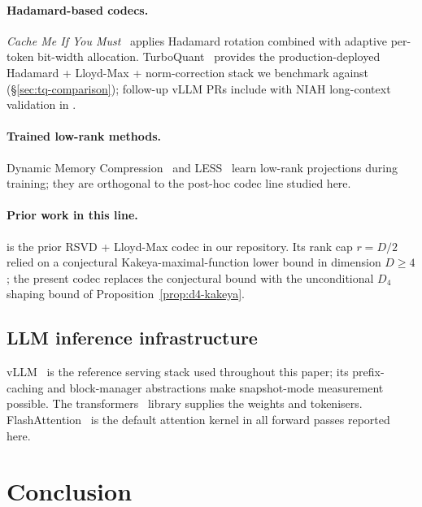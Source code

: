 \documentclass[11pt,a4paper]{article}
\theoremstyle{definition}
\theoremstyle{plain}
\begin{document}
\paragraph{Hadamard-based codecs.}
\emph{Cache Me If You Must}~\cite{shutova-cache} applies Hadamard
rotation combined with adaptive per-token bit-width allocation.
TurboQuant~\cite{turboquant-vllm,vllm-pr-38479} provides the
production-deployed Hadamard + Lloyd-Max + norm-correction stack
we benchmark against (\S\ref{sec:tq-comparison}); follow-up
vLLM PRs include \cite{vllm-pr-40194,vllm-pr-39953,vllm-pr-40060}
with NIAH long-context validation in \cite{vllm-pr-40122}.

\paragraph{Trained low-rank methods.}
Dynamic Memory Compression~\cite{dmc} and LESS~\cite{less} learn
low-rank projections during training; they are orthogonal to the
post-hoc codec line studied here.

\paragraph{Prior work in this line.}
\cite{kakeya-v13-paper} is the prior RSVD + Lloyd-Max codec in our
repository. Its rank cap $r = D/2$ relied on a conjectural
Kakeya-maximal-function lower bound in dimension $D\geq 4$; the
present codec replaces the conjectural bound with the unconditional
$D_4$ shaping bound of Proposition~\ref{prop:d4-kakeya}.

\subsection{LLM inference infrastructure}

vLLM~\cite{vllm} is the reference serving stack used throughout this
paper; its prefix-caching and block-manager abstractions make
snapshot-mode measurement possible. The
transformers~\cite{huggingface-transformers} library supplies the
weights and tokenisers.  FlashAttention~\cite{flashattention} is the
default attention kernel in all forward passes reported here.

\section{Conclusion}
\end{document}
